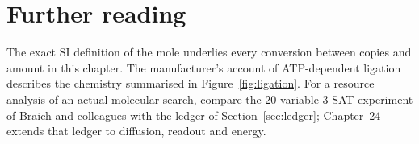 \section*{Further reading}
The exact SI definition of the mole underlies every conversion between copies
and amount in this chapter.\cite{BIPMmole} The manufacturer's account of
ATP-dependent ligation describes the chemistry summarised in
Figure~\ref{fig:ligation}.\cite{NEBLigation} For a resource analysis of an
actual molecular search, compare the 20-variable 3-SAT experiment of Braich and
colleagues\cite{Braich2002} with the ledger of Section~\ref{sec:ledger};
Chapter~24 extends that ledger to diffusion, readout and energy.
